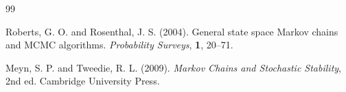 \documentclass{scrartcl}
\begin{document}
\begin{thebibliography}{99}

Roberts, G. O. and Rosenthal, J. S. (2004).
General state space Markov chains and MCMC algorithms.
\textit{Probability Surveys}, \textbf{1}, 20--71.

Meyn, S. P. and Tweedie, R. L. (2009).
\textit{Markov Chains and Stochastic Stability}, 2nd ed.
Cambridge University Press.


  



  


  
 



\end{thebibliography}
\end{document}
